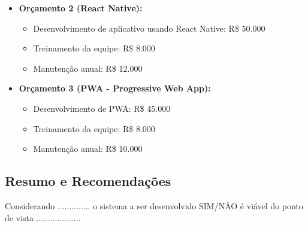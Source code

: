 \begin{itemize}
\begin{itemize}
			\item \textbf{Orçamento 2 (React Native):}
			\begin{itemize}
				\item Desenvolvimento de aplicativo usando React Native: R\$ 50.000
				\item Treinamento da equipe: R\$ 8.000
				\item Manutenção anual: R\$ 12.000
			\end{itemize}
			
			\item \textbf{Orçamento 3 (PWA - Progressive Web App):}
			\begin{itemize}
				\item Desenvolvimento de PWA: R\$ 45.000
				\item Treinamento da equipe: R\$ 8.000
				\item Manutenção anual: R\$ 10.000
			\end{itemize}
		\end{itemize}
	\end{itemize}

       \subsection{Resumo e Recomenda\c{c}\~{o}es}

       Considerando .............. o sistema a ser desenvolvido SIM/N\~{A}O \'{e} vi\'{a}vel do ponto de vista ...................
